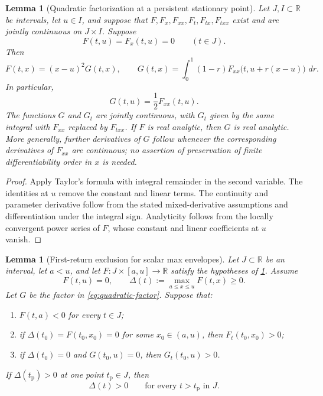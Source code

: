 \documentclass[11pt]{article}
\theoremstyle{plain}
\newtheorem{lemma}[theorem]{Lemma}
\theoremstyle{definition}
\theoremstyle{remark}
\newcommand{\R}{\mathbb R}
\newcommand{\dd}{\,d}
\begin{document}
\begin{lemma}[Quadratic factorization at a persistent stationary point]\label{lem:quadratic-factor}
Let \(J,I\subset\R\) be intervals, let \(u\in I\), and suppose that \(F,F_x,F_{xx},F_t,F_{tx},F_{txx}\) exist and are jointly continuous on \(J\times I\).  Suppose
\[
F(t,u)=F_x(t,u)=0
\qquad(t\in J).
\]
Then
\begin{equation}\label{eq:quadratic-factor}
F(t,x)=(x-u)^2G(t,x),
\qquad
G(t,x)=\int_0^1(1-r)F_{xx}\bigl(t,u+r(x-u)\bigr)\,\dd r.
\end{equation}
In particular,
\[
G(t,u)=\frac12F_{xx}(t,u).
\]
The functions \(G\) and \(G_t\) are jointly continuous, with \(G_t\) given by the same integral with \(F_{xx}\) replaced by \(F_{txx}\).  If \(F\) is real analytic, then \(G\) is real analytic.  More generally, further derivatives of \(G\) follow whenever the corresponding derivatives of \(F_{xx}\) are continuous; no assertion of preservation of finite differentiability order in \(x\) is needed.
\end{lemma}

\begin{proof}
Apply Taylor's formula with integral remainder in the second variable.  The identities at \(u\) remove the constant and linear terms.  The continuity and parameter derivative follow from the stated mixed-derivative assumptions and differentiation under the integral sign.  Analyticity follows from the locally convergent power series of \(F\), whose constant and linear coefficients at \(u\) vanish.
\end{proof}

\begin{lemma}[First-return exclusion for scalar max envelopes]\label{lem:first-return}
Let \(J\subset\R\) be an interval, let \(a<u\), and let \(F:J\times[a,u]\to\R\) satisfy the hypotheses of \cref{lem:quadratic-factor}.  Assume
\[
F(t,u)=0,
\qquad
\Delta(t):=\max_{a\le x\le u}F(t,x)\ge0.
\]
Let \(G\) be the factor in \eqref{eq:quadratic-factor}.  Suppose that:
\begin{enumerate}[label=\textup{(\roman*)}]
\item \(F(t,a)<0\) for every \(t\in J\);
\item if \(\Delta(t_0)=F(t_0,x_0)=0\) for some \(x_0\in(a,u)\), then \(F_t(t_0,x_0)>0\);
\item if \(\Delta(t_0)=0\) and \(G(t_0,u)=0\), then \(G_t(t_0,u)>0\).
\end{enumerate}
If \(\Delta(t_{\mathrm p})>0\) at one point \(t_{\mathrm p}\in J\), then
\[
\Delta(t)>0
\qquad
\text{for every }t>t_{\mathrm p}\text{ in }J.
\]
\end{lemma}
\end{document}
